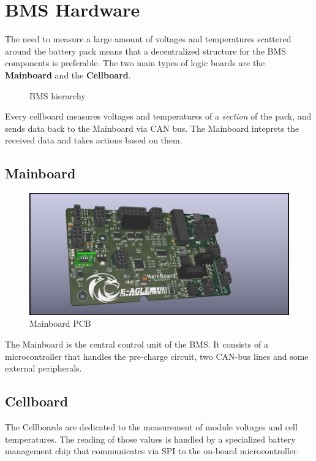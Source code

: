 \chapter{BMS Hardware}
\label{cha:hardware}

The need to measure a large amount of voltages and temperatures scattered around the battery pack means that a decentralized structure for the BMS components is preferable. The two main types of logic boards are the \textbf{Mainboard} and the \textbf{Cellboard}.
\begin{figure}[h]
    \centering
    
    \caption{BMS hierarchy}
    \label{fig:bms_hierarchy}
\end{figure}
Every cellboard measures voltages and temperatures of a \textsl{section} of the pack, and sends data back to the Mainboard via CAN bus. The Mainboard inteprets the received data and takes actions based on them.


\section{Mainboard}
\begin{figure}[h]
    \centering
    \includegraphics[scale=0.5]{pictures/mainboard.jpg}
    \caption{Mainboard PCB}
    \label{fig:mainboard}
\end{figure}
The Mainboard is the central control unit of the BMS. It consists of a microcontroller that handles the pre-charge circuit, two CAN-bus lines and some external peripherals.


\section{Cellboard}
The Cellboards are dedicated to the measurement of module voltages and cell temperatures. The reading of those values is handled by a specialized battery management chip that communicates via SPI to the on-board microcontroller.

